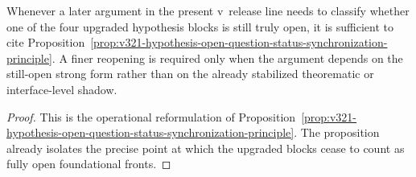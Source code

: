 \begin{corollary}
\label{cor:use-rule-for-the-synchronized-v321-status-reading}
Whenever a later argument in the present v\docversion\ release line needs to classify whether one of the four upgraded hypothesis blocks is still truly open, it is sufficient to cite Proposition~\ref{prop:v321-hypothesis-open-question-status-synchronization-principle}. A finer reopening is required only when the argument depends on the still-open strong form rather than on the already stabilized theorematic or interface-level shadow.
\end{corollary}

\begin{proof}
This is the operational reformulation of Proposition~\ref{prop:v321-hypothesis-open-question-status-synchronization-principle}. The proposition already isolates the precise point at which the upgraded blocks cease to count as fully open foundational fronts.
\end{proof}


